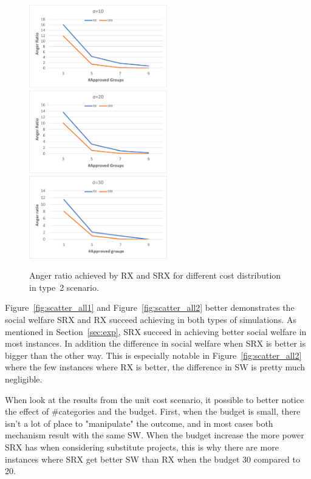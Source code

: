 \documentclass[runningheads]{llncs}
\begin{document}
\begin{subappendices}
\begin{figure}[t]
\begin{center}
\includegraphics[width=6cm]{simulation/constant_substitutes_ar_10.png}
\includegraphics[width=6cm]{simulation/constant_substitutes_ar_20.png}
\includegraphics[width=6cm]{simulation/constant_substitutes_ar_30.png}
\caption{Anger ratio achieved by RX and SRX for different cost distribution in type~2 scenario.
}\label{fig:ar_all2}
\end{center}
\end{figure}

Figure~\ref{fig:scatter_all1} and Figure~\ref{fig:scatter_all2} better demonstrates the social welfare SRX and RX succeed achieving in both types of simulations. As mentioned in Section~\ref{sec:exp}, SRX succeed in achieving better social welfare in most instances. In addition the difference in social welfare when SRX is better is bigger than the other way. This is especially notable in Figure~\ref{fig:scatter_all2} where the few instances where RX is better, the difference in SW is pretty much negligible.

When look at the results from the unit cost scenario, it possible to better notice the effect of \#categories and the budget. First, when the budget is small, there isn't a lot of place to "manipulate" the outcome, and in most cases both mechanism result with the same SW. When the budget increase the more power SRX has when considering substitute projects, this is why there are more instances where SRX get better SW than RX when the budget 30 compared to 20.


\end{subappendices}
\end{document}

